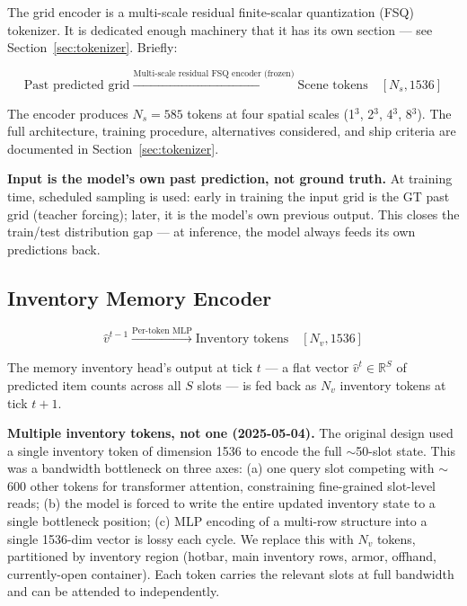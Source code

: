 \documentclass[11pt,a4paper]{article}
\begin{document}
The grid encoder is a multi-scale residual finite-scalar quantization (FSQ) tokenizer. It is dedicated enough machinery that it has its own section --- see Section~\ref{sec:tokenizer}. Briefly:

\[
\text{Past predicted grid} \xrightarrow{\text{Multi-scale residual FSQ encoder (frozen)}} \text{Scene tokens} \quad [N_s, 1536]
\]

The encoder produces $N_s = 585$ tokens at four spatial scales (1$^3$, 2$^3$, 4$^3$, 8$^3$). The full architecture, training procedure, alternatives considered, and ship criteria are documented in Section~\ref{sec:tokenizer}.

\begin{designdecision}
\textbf{Input is the model's own past prediction, not ground truth.} At training time, scheduled sampling is used: early in training the input grid is the GT past grid (teacher forcing); later, it is the model's own previous output. This closes the train/test distribution gap --- at inference, the model always feeds its own predictions back.
\end{designdecision}

\subsection{Inventory Memory Encoder}

\[
\hat{v}^{t-1} \xrightarrow{\text{Per-token MLP}} \text{Inventory tokens} \quad [N_v, 1536]
\]

The memory inventory head's output at tick $t$ --- a flat vector $\hat{v}^t \in \mathbb{R}^{S}$ of predicted item counts across all $S$ slots --- is fed back as $N_v$ inventory tokens at tick $t+1$.

\begin{designdecision}
\textbf{Multiple inventory tokens, not one (2025-05-04).} The original design used a single inventory token of dimension 1536 to encode the full $\sim$50-slot state. This was a bandwidth bottleneck on three axes: (a) one query slot competing with $\sim$600 other tokens for transformer attention, constraining fine-grained slot-level reads; (b) the model is forced to write the entire updated inventory state to a single bottleneck position; (c) MLP encoding of a multi-row structure into a single 1536-dim vector is lossy each cycle. We replace this with $N_v$ tokens, partitioned by inventory region (hotbar, main inventory rows, armor, offhand, currently-open container). Each token carries the relevant slots at full bandwidth and can be attended to independently.
\end{designdecision}
\end{document}
